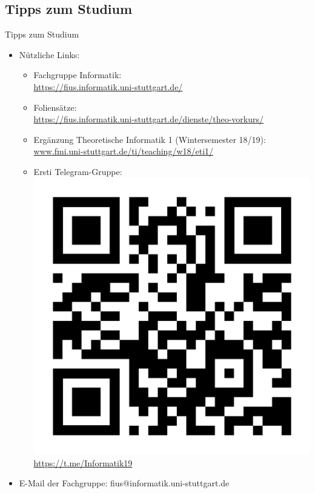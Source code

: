 \subsection{Tipps zum Studium}
\begin{frame}[fragile]{Tipps zum Studium}
    \begin{itemize}
        \item Nützliche Links:\\
            \begin{itemize}
                \item Fachgruppe Informatik:\\
                \url{https://fius.informatik.uni-stuttgart.de/}
                \item Foliensätze:\\ \url{https://fius.informatik.uni-stuttgart.de/dienste/theo-vorkurs/}
                \item Ergänzung Theoretische Informatik 1 (Wintersemester 18/19): \\
                \url{www.fmi.uni-stuttgart.de/ti/teaching/w18/eti1/}
  				\item Ersti Telegram-Gruppe:\\ 
            	\includegraphics[scale=0.04]{../figures/telegram.png}
            	\url{https://t.me/Informatik19}
        	\end{itemize}
        \item E-Mail der Fachgruppe: fius@informatik.uni-stuttgart.de
            
    \end{itemize}
\end{frame}
